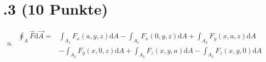 \section*{\nr.3 \titthree (10 Punkte)}
\begin{enumerate}[(a)]
\item

\begin{align*}
\oint_A \vec{F}\mathrm{d}\vec{A} = &\int_{A_{1}} F_{x}(a,y,z)\mathrm{d}A - \int_{A_{1}} F_{x}(0,y,z)\mathrm{d}A + \int_{A_{2}} F_{y}(x,a,z)\mathrm{d}A \\ & - \int_{A_{2}} F_{y}(x,0,z)\mathrm{d}A + \int_{A_{3}} F_{z}(x,y,a)\mathrm{d}A - \int_{A_{3}} F_{z}(x,y,0)\mathrm{d}A 
\end{align*}

\end{enumerate}